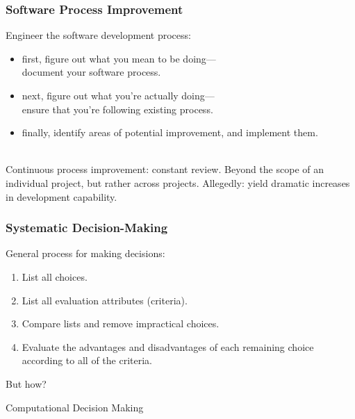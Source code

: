\begin{frame}
\frametitle{Software Process Improvement}

\begin{changemargin}{1cm}
Engineer the software development process:
\begin{itemize}
\item first, figure out what you mean to be doing---\\
document your software process.
\item next, figure out what you're actually doing---\\
ensure that you're following existing process.
\item finally, identify areas of potential improvement, and implement them.
\end{itemize}
~\\

Continuous process improvement: constant review.
Beyond the scope of an individual project, but rather across projects.
Allegedly: yield dramatic increases in development capability.
\end{changemargin}

\end{frame}

\begin{frame}
\frametitle{Systematic Decision-Making}

\begin{changemargin}{1cm}
General process for making decisions:

\begin{enumerate}
\item List all choices.
\item List all evaluation attributes (criteria).
\item Compare lists and remove impractical choices.
\item Evaluate the advantages and disadvantages of each remaining choice
according to all of the criteria.
\end{enumerate}

But how?
\end{changemargin}

\end{frame}

\begin{frame}
	
	
	\vspace{8em}
	
	\begin{block}
	 {\huge Computational Decision Making}
	\end{block}
	
\end{frame}


